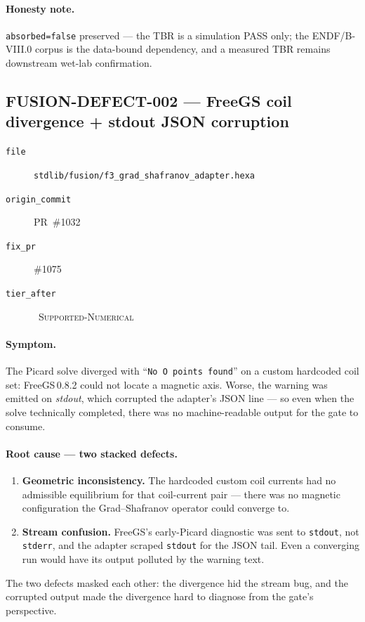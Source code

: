\paragraph{Honesty note.}
\texttt{absorbed=false} preserved --- the TBR is a simulation PASS only;
the ENDF/B-VIII.0 corpus is the data-bound dependency, and a measured
TBR remains downstream wet-lab confirmation.

\subsection{FUSION-DEFECT-002 --- FreeGS coil divergence + stdout JSON corruption}
\label{app:adapters:freegs}

\begin{description}
  \item[\texttt{file}] \texttt{stdlib/fusion/f3\_grad\_shafranov\_adapter.hexa}
  \item[\texttt{origin\_commit}] PR~\#1032
  \item[\texttt{fix\_pr}] \#1075
  \item[\texttt{tier\_after}] \tierGreen\ \textsc{Supported-Numerical}
\end{description}

\paragraph{Symptom.}
The Picard solve diverged with ``\texttt{No O points found}'' on a
custom hardcoded coil set: FreeGS\,0.8.2 could not locate a magnetic
axis. Worse, the warning was emitted on \emph{stdout}, which corrupted
the adapter's JSON line --- so even when the solve technically completed,
there was no machine-readable output for the gate to consume.

\paragraph{Root cause --- two stacked defects.}
\begin{enumerate}
  \item \textbf{Geometric inconsistency.} The hardcoded custom coil
        currents had no admissible equilibrium for that coil-current
        pair --- there was no magnetic configuration the Grad--Shafranov
        operator could converge to.
  \item \textbf{Stream confusion.} FreeGS's early-Picard diagnostic was
        sent to \texttt{stdout}, not \texttt{stderr}, and the adapter
        scraped \texttt{stdout} for the JSON tail. Even a converging run
        would have its output polluted by the warning text.
\end{enumerate}
The two defects masked each other: the divergence hid the stream bug,
and the corrupted output made the divergence hard to diagnose from the
gate's perspective.

